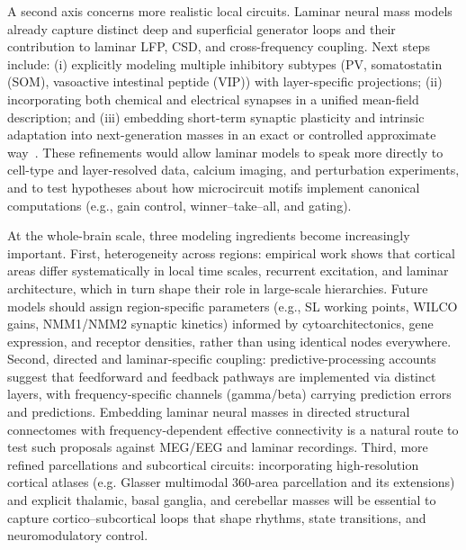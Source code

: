 \documentclass[11pt]{article}
\numberwithin{equation}{section}
\begin{document}
A second axis concerns more realistic local circuits. Laminar neural mass models already capture distinct deep and superficial generator loops and their contribution to laminar LFP, CSD, and cross-frequency coupling.\cite{sanchez-todoPhysicalNeuralMass2023,Ruffini2020P118} Next steps include: (i) explicitly modeling multiple inhibitory subtypes (PV, somatostatin (SOM), vasoactive intestinal peptide (VIP)) with layer-specific projections; (ii) incorporating both chemical and electrical synapses in a unified mean-field description; and (iii) embedding short-term synaptic plasticity and intrinsic adaptation into next-generation masses in an exact or controlled approximate way~\cite{Devalle:2017aa,taherExactNeuralMass2020,chenExactMeanfieldModels2022}. These refinements would allow laminar models to speak more directly to cell-type and layer-resolved data, calcium imaging, and perturbation experiments, and to test hypotheses about how microcircuit motifs implement canonical computations (e.g., gain control, winner–take–all, and gating).

At the whole-brain scale, three modeling ingredients become increasingly important. First, heterogeneity across regions: empirical work shows that cortical areas differ systematically in local time scales, recurrent excitation, and laminar architecture, which in turn shape their role in large-scale hierarchies.\cite{mejiasFeedforwardFeedbackFrequencydependent2016,rautOrganizationPropagatedIntrinsic2020} Future models should assign region-specific parameters (e.g., SL working points, WILCO gains, NMM1/NMM2 synaptic kinetics) informed by cytoarchitectonics, gene expression, and receptor densities, rather than using identical nodes everywhere. Second, directed and laminar-specific coupling: predictive-processing accounts suggest that feedforward and feedback pathways are implemented via distinct layers, with frequency-specific channels (gamma/beta) carrying prediction errors and predictions.\cite{bastosCanonicalMicrocircuitsPredictive2012,fristonFreeenergyPrincipleUnified2010} Embedding laminar neural masses in directed structural connectomes with frequency-dependent effective connectivity is a natural route to test such proposals against MEG/EEG and laminar recordings. Third, more refined parcellations and subcortical circuits: incorporating high-resolution cortical atlases (e.g. Glasser multimodal 360-area parcellation and its extensions)\cite{glasserMultimodalParcellationHuman2016} and explicit thalamic, basal ganglia, and cerebellar masses\cite{kringelbach_dynamic_2020,cofreWholeBrainModelsExplore2020,rautOrganizationPropagatedIntrinsic2020} will be essential to capture cortico–subcortical loops that shape rhythms, state transitions, and neuromodulatory control.
\end{document}

